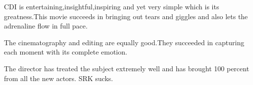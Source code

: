 \documentclass[]{article}
\begin{document}
CDI is entertaining,insightful,inspiring and yet very simple which is its greatness.This movie succeeds in bringing out tears and giggles and also lets the adrenaline flow in full pace.

The cinematography and editing are equally good.They succeeded in capturing each moment with its complete emotion.

The director has treated the subject extremely well and has brought 100 percent from all the new actors.
SRK sucks.
\end{document}
